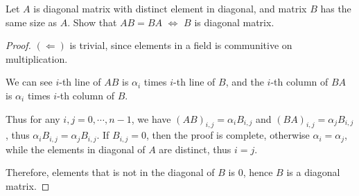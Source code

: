 \documentclass[../main.tex]{subfiles}
\begin{document}
\begin{exercise}
  Let $A$ is diagonal matrix with distinct element in diagonal, and matrix $B$
  has the same size as $A$.
  Show that $AB = BA$ $\iff$ $B$ is diagonal matrix.
\end{exercise}
\begin{proof}
  $(\Leftarrow)$ is trivial, since elements in a field is communitive on multiplication.

  We can see $i$-th line of $AB$ is $\alpha_i$ times $i$-th line of $B$,
  and the $i$-th column of $BA$ is $\alpha_i$ times $i$-th column of $B$.

  Thus for any $i, j = 0, \cdots, n - 1$, we have $(AB)_{i, j} = \alpha_i B_{i, j}$
  and $(BA)_{i, j} = \alpha_j B_{i, j}$, thus $\alpha_i B_{i, j} = \alpha_j B_{i, j}$.
  If $B_{i, j} = 0$, then the proof is complete, otherwise $\alpha_i = \alpha_j$,
  while the elements in diagonal of $A$ are distinct, thus $i = j$.

  Therefore, elements that is not in the diagonal of $B$ is $0$, hence $B$ is a diagonal matrix.
\end{proof}
\end{document}
